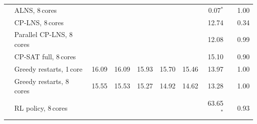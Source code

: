 \begin{longtable}{llrrrrrrrr}
 & ALNS, 8\,cores &  &  &  &  &  & 0.07$^*$ &  & 1.00 \\
 & CP-LNS, 8\,cores &  &  &  &  &  & 12.74 &  & 0.34 \\
 & Parallel CP-LNS, 8\,cores &  &  &  &  &  & 12.08 &  & 0.99 \\
 & CP-SAT full, 8\,cores &  &  &  &  &  & 15.10 &  & 0.90 \\
 & Greedy restarts, 1\,core & 16.09 & 16.09 & 15.93 & 15.70 & 15.46 & 13.97 &  & 1.00 \\
 & Greedy restarts, 8\,cores & 15.55 & 15.53 & 15.27 & 14.92 & 14.62 & 13.28 &  & 1.00 \\
 & RL policy, 8\,cores &  &  &  &  &  & 63.65$^*$ &  & 0.93 \\
\bottomrule
\end{longtable}
